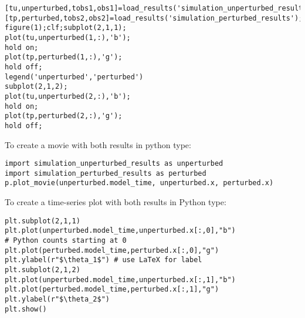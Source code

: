 \ifshowmatlab
\begin{lstlisting}[style=MatlabStyle, caption={Matlab}]
[tu,unperturbed,tobs1,obs1]=load_results('simulation_unperturbed_results');
[tp,perturbed,tobs2,obs2]=load_results('simulation_perturbed_results');
figure(1);clf;subplot(2,1,1);
plot(tu,unperturbed(1,:),'b');
hold on;
plot(tp,perturbed(1,:),'g');
hold off;
legend('unperturbed','perturbed')
subplot(2,1,2);
plot(tu,unperturbed(2,:),'b');
hold on;
plot(tp,perturbed(2,:),'g');
hold off;\end{lstlisting}
\fi
      
To create a movie with both results in python type:
\begin{lstlisting}[style=PythonStyle,caption={Python initialize}]
import simulation_unperturbed_results as unperturbed
import simulation_perturbed_results as perturbed
p.plot_movie(unperturbed.model_time, unperturbed.x, perturbed.x)
\end{lstlisting}

To create a time-series plot with both results in Python type:
\begin{lstlisting}[style=PythonStyle,caption={Python}]
plt.subplot(2,1,1)
plt.plot(unperturbed.model_time,unperturbed.x[:,0],"b") 
# Python counts starting at 0
plt.plot(perturbed.model_time,perturbed.x[:,0],"g")
plt.ylabel(r"$\theta_1$") # use LaTeX for label
plt.subplot(2,1,2)
plt.plot(unperturbed.model_time,unperturbed.x[:,1],"b")
plt.plot(perturbed.model_time,perturbed.x[:,1],"g")
plt.ylabel(r"$\theta_2$")
plt.show() \end{lstlisting}

